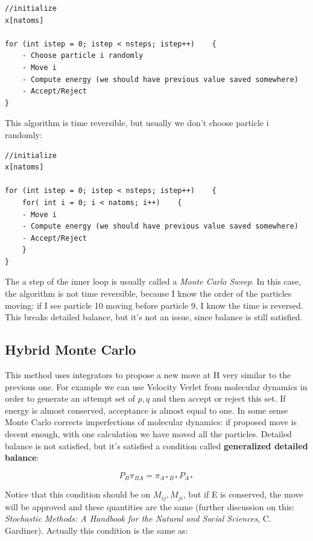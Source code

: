 \documentclass[a4paper, italian, openany]{book}
\begin{document}
\begin{lstlisting}
//initialize
x[natoms]

for (int istep = 0; istep < nsteps; istep++)	{
	- Choose particle i randomly
	- Move i
	- Compute energy (we should have previous value saved somewhere)
	- Accept/Reject
}
\end{lstlisting}

This algorithm is time reversible, but usually we don't choose particle i randomly:

\begin{lstlisting}
//initialize
x[natoms]

for (int istep = 0; istep < nsteps; istep++)	{
	for( int i = 0; i < natoms; i++)	{
	- Move i
	- Compute energy (we should have previous value saved somewhere)
	- Accept/Reject
	}
}
\end{lstlisting}

The a step of the inner loop is usually called a \textit{Monte Carlo Sweep}. In this case, the algorithm is not time reversible, because I know the order of the particles moving: if I see particle 10 moving before particle 9, I know the time is reversed. This breaks detailed balance, but it's not an issue, since balance is still satisfied.

\subsection{Hybrid Monte Carlo}

This method uses integrators to propose a new move at H very similar to the previous one. For example we can use Velocity Verlet from molecular dynamics in order to generate an attempt set of $p, q$ and then accept or reject this set. If energy is almost conserved, acceptance is almost equal to one.\newline
In some sense Monte Carlo corrects imperfections of molecular dynamics: if proposed move is decent enough, with one calculation we have moved all the particles.\newline
Detailed balance is not satisfied, but it's satisfied a condition called \textbf{generalized detailed balance}:

$$P_B \pi_{BA} = \pi_{A*B*} P_{A*}$$

Notice that this condition should be on $M_{ij}, M_{ji}$, but if E is conserved, the move will be approved and these quantities are the same (further discussion on this: \textit{Stochastic Methods: A Handbook for the Natural and Social Sciences}, C. Gardiner).\newline
Actually this condition is the same as:
\end{document}
